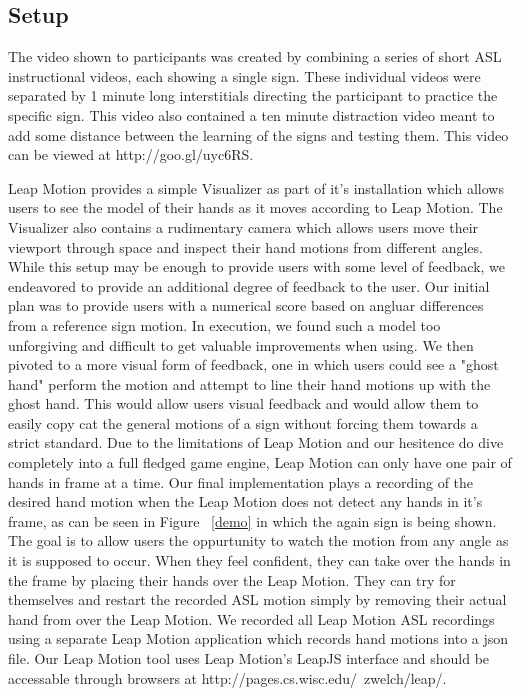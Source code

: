 \documentclass{sigchi}
\begin{document}
\subsection{Setup}

The video shown to participants was created by combining a series of short ASL instructional videos, each showing a single sign.  These individual videos were separated by 1 minute long interstitials directing the participant to practice the specific sign.  This video also contained a ten minute distraction video meant to add some distance between the learning of the signs and testing them.  This video can be viewed at http://goo.gl/uyc6RS.  

Leap Motion provides a simple Visualizer as part of it's installation which allows users to see the model of their hands as it moves according to Leap Motion. The Visualizer also contains a rudimentary camera which allows users move their viewport through space and inspect their hand motions from different angles.  While this setup may be enough to provide users with some level of feedback, we endeavored to provide an additional degree of feedback to the user.  Our initial plan was to provide users with a numerical score based on angluar differences from a reference sign motion.  In execution, we found such a model too unforgiving and difficult to get valuable improvements when using.  We then pivoted to a more visual form of feedback, one in which users could see a "ghost hand" perform the motion and attempt to line their hand motions up with the ghost hand.  This would allow users visual feedback and would allow them to easily copy cat the general motions of a sign without forcing them towards a strict standard.  Due to the limitations of Leap Motion and our hesitence do dive completely into a full fledged game engine, Leap Motion can only have one pair of hands in frame at a time.  Our final implementation plays a recording of the desired hand motion when the Leap Motion does not detect any hands in it's frame, as can be seen in Figure ~\ref{demo} in which the again sign is being shown.  The goal is to allow users the oppurtunity to watch the motion from any angle as it is supposed to occur.  When they feel confident, they can take over the hands in the frame by placing their hands over the Leap Motion.  They can try for themselves and restart the recorded ASL motion simply by removing their actual hand from over the Leap Motion.  We recorded all Leap Motion ASL recordings using a separate Leap Motion application which records hand motions into a json file. Our Leap Motion tool uses Leap Motion's LeapJS interface and should be accessable through browsers at http://pages.cs.wisc.edu/~zwelch/leap/.
\end{document}
